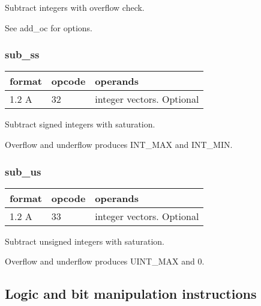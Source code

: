 \documentclass[forwardcom.tex]{subfiles}
\begin{document}
Subtract integers with overflow check.

See add\_oc for options.

\subsubsection{sub\_ss}
\label{table:subSsInstruction}
\begin{tabular}{|p{12mm}|p{12mm}|p{110mm}|}
\hline
\bfseries format & \bfseries opcode & \bfseries operands \\ \hline
1.2 A & 32 & integer vectors. Optional \\ \hline
\end{tabular}
\vspace{2mm}

Subtract signed integers with saturation.

Overflow and underflow produces INT\_MAX and INT\_MIN.

\subsubsection{sub\_us}
\label{table:subUsInstruction}
\begin{tabular}{|p{12mm}|p{12mm}|p{110mm}|}
\hline
\bfseries format & \bfseries opcode & \bfseries operands \\ \hline
1.2 A & 33 & integer vectors. Optional \\ \hline
\end{tabular}
\vspace{2mm}

Subtract unsigned integers with saturation.

Overflow and underflow produces UINT\_MAX and 0.


\subsection{Logic and bit manipulation instructions}
\end{document}
